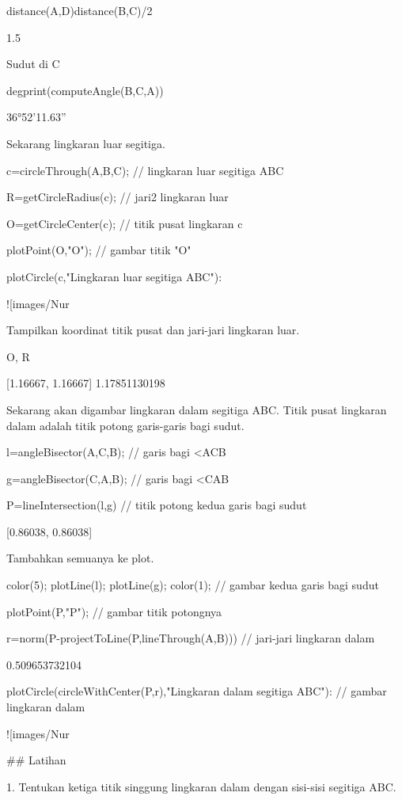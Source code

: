 \documentclass{article}
\begin{document}
\>distance(A,D)\*distance(B,C)/2


    1.5

Sudut di C


\>degprint(computeAngle(B,C,A))


    36°52'11.63''

Sekarang lingkaran luar segitiga.


\>c=circleThrough(A,B,C); // lingkaran luar segitiga ABC

\>R=getCircleRadius(c); // jari2 lingkaran luar 

\>O=getCircleCenter(c); // titik pusat lingkaran c 

\>plotPoint(O,"O"); // gambar titik "O"

\>plotCircle(c,"Lingkaran luar segitiga ABC"):


![images/Nur%

Tampilkan koordinat titik pusat dan jari-jari lingkaran luar.


\>O, R


    [1.16667,  1.16667]
    1.17851130198

Sekarang akan digambar lingkaran dalam segitiga ABC. Titik pusat lingkaran dalam adalah
titik potong garis-garis bagi sudut.


\>l=angleBisector(A,C,B); // garis bagi <ACB

\>g=angleBisector(C,A,B); // garis bagi <CAB

\>P=lineIntersection(l,g) // titik potong kedua garis bagi sudut


    [0.86038,  0.86038]

Tambahkan semuanya ke plot.


\>color(5); plotLine(l); plotLine(g); color(1); // gambar kedua garis bagi sudut

\>plotPoint(P,"P"); // gambar titik potongnya

\>r=norm(P-projectToLine(P,lineThrough(A,B))) // jari-jari lingkaran dalam


    0.509653732104

\>plotCircle(circleWithCenter(P,r),"Lingkaran dalam segitiga ABC"): // gambar lingkaran dalam


![images/Nur%

## Latihan

1. Tentukan ketiga titik singgung lingkaran dalam dengan sisi-sisi
segitiga ABC.
\end{document}
